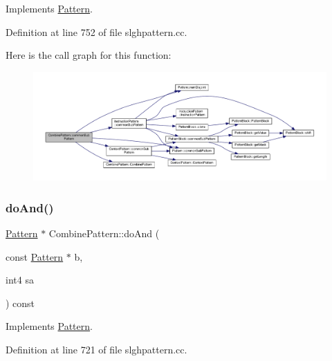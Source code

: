 Implements \mbox{\hyperlink{class_pattern_a54daed6fc84146ad309a25dfa8a68052}{Pattern}}.



Definition at line 752 of file slghpattern.\+cc.

Here is the call graph for this function\+:
\nopagebreak
\begin{figure}[H]
\begin{center}
\leavevmode
\includegraphics[width=350pt]{class_combine_pattern_a161632a4352aed9b12d9a7497d8af681_cgraph}
\end{center}
\end{figure}
\mbox{\label{class_combine_pattern_aaa5045424b76fd037a192fb4654c7ed8}} 
\subsubsection{\texorpdfstring{doAnd()}{doAnd()}}
{\footnotesize\ttfamily \mbox{\hyperlink{class_pattern}{Pattern}} $\ast$ Combine\+Pattern\+::do\+And (\begin{DoxyParamCaption}\item[{const \mbox{\hyperlink{class_pattern}{Pattern}} $\ast$}]{b,  }\item[{int4}]{sa }\end{DoxyParamCaption}) const\hspace{0.3cm}{\ttfamily [virtual]}}



Implements \mbox{\hyperlink{class_pattern_a960f3e000e2642c452fe11f5b55a9589}{Pattern}}.



Definition at line 721 of file slghpattern.\+cc.

